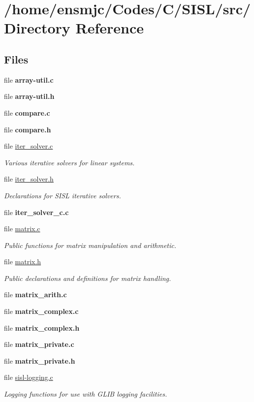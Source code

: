\hypertarget{dir_000000}{
\section{/home/ensmjc/Codes/C/SISL/src/ Directory Reference}
\label{dir_000000}
}
\subsection*{Files}
\begin{CompactItemize}
\item 
file {\bf array-util.c}
\item 
file {\bf array-util.h}
\item 
file {\bf compare.c}
\item 
file {\bf compare.h}
\item 
file \hyperlink{iter__solver_8c}{iter\_\-solver.c}
\begin{CompactList}\small\item\em Various iterative solvers for linear systems. \item\end{CompactList}

\item 
file \hyperlink{iter__solver_8h}{iter\_\-solver.h}
\begin{CompactList}\small\item\em Declarations for SISL iterative solvers. \item\end{CompactList}

\item 
file {\bf iter\_\-solver\_\-c.c}
\item 
file \hyperlink{matrix_8c}{matrix.c}
\begin{CompactList}\small\item\em Public functions for matrix manipulation and arithmetic. \item\end{CompactList}

\item 
file \hyperlink{matrix_8h}{matrix.h}
\begin{CompactList}\small\item\em Public declarations and definitions for matrix handling. \item\end{CompactList}

\item 
file {\bf matrix\_\-arith.c}
\item 
file {\bf matrix\_\-complex.c}
\item 
file {\bf matrix\_\-complex.h}
\item 
file {\bf matrix\_\-private.c}
\item 
file {\bf matrix\_\-private.h}
\item 
file \hyperlink{sisl-logging_8c}{sisl-logging.c}
\begin{CompactList}\small\item\em Logging functions for use with GLIB logging facilities. \item\end{CompactList}


\end{CompactItemize}
